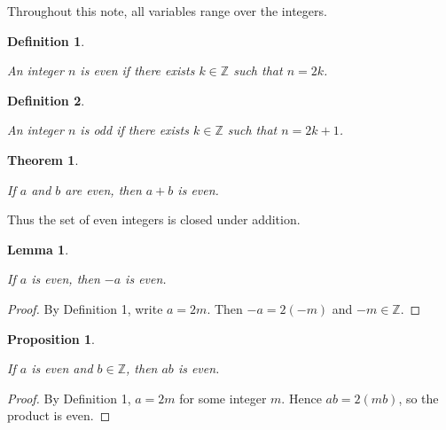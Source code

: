 \documentclass{article}
\newtheorem{definition}{Definition}
\newtheorem{theorem}{Theorem}
\newtheorem{lemma}{Lemma}
\newtheorem{proposition}{Proposition}
\begin{document}
Throughout this note, all variables range over the integers.

\begin{definition}

\label{def:even}

An integer $n$ is even if there exists $k\in\mathbb{Z}$ such that $n=2k$.

\end{definition}

\begin{definition}

\label{def:odd}

An integer $n$ is odd if there exists $k\in\mathbb{Z}$ such that $n=2k+1$.

\end{definition}

\newpage

\begin{theorem}

\label{thm:add}

If $a$ and $b$ are even, then $a+b$ is even.

\end{theorem}

Thus the set of even integers is closed under addition.

\begin{lemma}

\label{lem:negative}

If $a$ is even, then $-a$ is even.

\end{lemma}

\begin{proof}

By Definition 1, write $a=2m$. Then $-a=2(-m)$ and $-m\in\mathbb{Z}$.

\end{proof}

\newpage

\begin{proposition}

\label{prop:product}

If $a$ is even and $b\in\mathbb{Z}$, then $ab$ is even.

\end{proposition}

\begin{proof}

By Definition 1, $a=2m$ for some integer $m$. Hence $ab=2(mb)$, so the product is even.

\end{proof}
\end{document}

